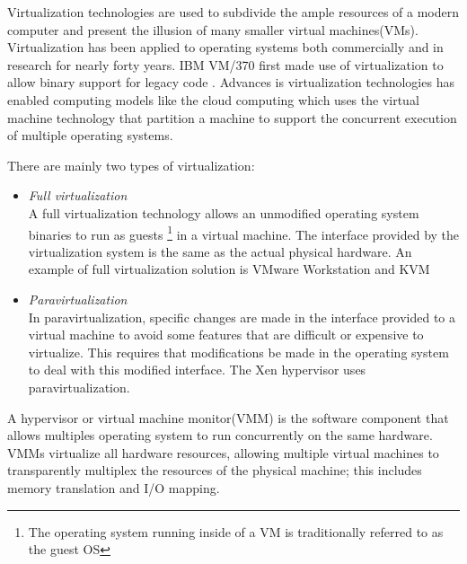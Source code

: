 \documentclass[12pt,a4paper]{report}
\begin{document}
Virtualization technologies are 
used to subdivide the ample resources of a modern computer and present the illusion of many
smaller virtual machines(VMs)\cite{barham2003xen}.
Virtualization has been applied to operating systems both commercially and in research for nearly forty years.
IBM VM/370 first made use of virtualization to allow binary support for legacy code \cite{gum1983virt}.
Advances is virtualization technologies has enabled computing models like the cloud computing which uses
the virtual machine technology that partition a machine to support the concurrent
execution of multiple operating systems.

There are mainly two types of virtualization: \cite{matthews2007quantifying}

\begin{itemize}

 \item \emph{Full virtualization} \\
  A full virtualization technology allows an unmodified operating system binaries to run as 
guests \footnote{The operating system running inside of a VM is traditionally referred to as the guest OS} 
  in a virtual machine. The interface provided by the  virtualization system is the same as the actual physical
 hardware. An example of full virtualization solution is VMware Workstation\cite{website:vmware} and KVM \cite{website:kvm}

 \item \emph{Paravirtualization} \\
  In paravirtualization, specific changes are made in the interface provided to a virtual machine to avoid some features that are difficult or expensive to virtualize. This requires that modifications be made in the operating system to deal with this modified interface. The Xen hypervisor \cite{website:xen} uses paravirtualization.
\end{itemize}




A hypervisor or virtual machine monitor(VMM) is the software component that allows multiples operating system to run
concurrently on the same hardware. VMMs virtualize all hardware resources, allowing multiple virtual machines to transparently multiplex the resources of the physical machine; this includes memory translation and I/O mapping.
\end{document}
